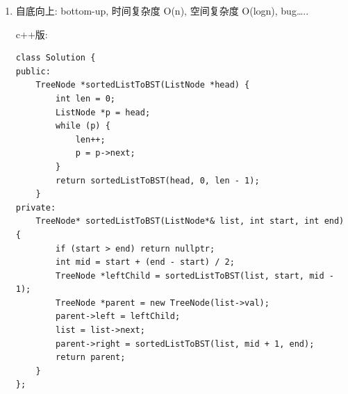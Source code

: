 \documentclass[12pt]{book}
\begin{document}
\begin{enumerate}
\begin{lstlisting}
public TreeNode sortListToBST(ListNode head, int len) {
    if (len == 0) return null;
    if (len == 1) return new TreeNode(head.val);
    TreeNode root = new TreeNode(nth_node(head, len / 2 + 1).val);
    root.left = sortListToBST(head, len / 2);
    root.right = sortListToBST(nth_node(head, len / 2 + 2), (len - 1) / 2);
    return root;
}

public TreeNode sortedListToBST(ListNode head) {
    return sortListToBST(head, listLength(head));
}
\end{lstlisting}

换一种方式，如果我只走一遍 list,那可以把数据存在一个数组中，方便O（1）
时间获得数据。自已写的乱代码。

\lstset{language=java,label= ,caption= ,numbers=none}
\begin{lstlisting}
public TreeNode createMyTree(ListNode [] num, int bgn, int end) {
    TreeNode root = null;
    if (bgn == end) {
        root = new TreeNode(num[end].val);
        return root;
    }
    if (bgn < end) {
        int mid = bgn + (end - bgn) / 2;
        root = new TreeNode(num[mid].val);
        root.left = createMyTree(num, bgn, mid - 1);
        root.right = createMyTree(num, mid + 1, end);
        return root;
    }
    return null;
}

public TreeNode sortedListToBST(ListNode head) {
    TreeNode root = null;
    if (head == null) return null;
    else if (head.next == null) {
        root = new TreeNode(head.val);
        return root;   
    }
    ListNode [] num = new ListNode[100000]; // 10,0000 works, 50000 doesn't
    ListNode curr = head;
    int idx = 0;
    while (curr != null) {
        num[idx++] = curr;
        curr = curr.next;
    }
    root = createMyTree(num, 0, idx - 1);
    return root;
}
\end{lstlisting}

\item 自底向上: bottom-up, 时间复杂度 O(n), 空间复杂度 O(logn), bug\ldots{}..
\label{sec-4-4-3-2}

c++版:
\lstset{language=java,label= ,caption= ,numbers=none}
\begin{lstlisting}
class Solution {
public:
    TreeNode *sortedListToBST(ListNode *head) {
        int len = 0;
        ListNode *p = head;
        while (p) {
            len++;
            p = p->next;
        }
        return sortedListToBST(head, 0, len - 1);
    }
private:
    TreeNode* sortedListToBST(ListNode*& list, int start, int end) {
        if (start > end) return nullptr;
        int mid = start + (end - start) / 2;
        TreeNode *leftChild = sortedListToBST(list, start, mid - 1);
        TreeNode *parent = new TreeNode(list->val);
        parent->left = leftChild;
        list = list->next;
        parent->right = sortedListToBST(list, mid + 1, end);
        return parent;
    }
};
\end{lstlisting}


\end{enumerate}
\end{document}
